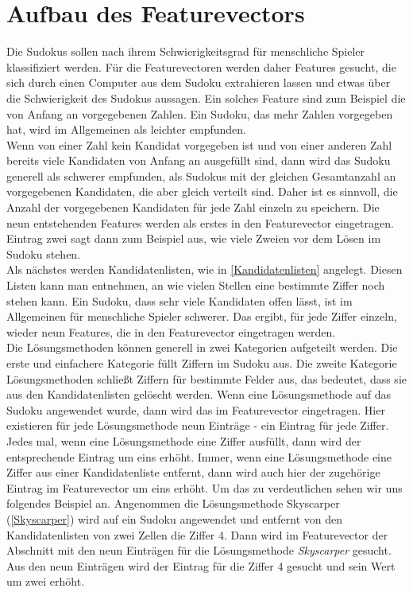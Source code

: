 \section{Aufbau des Featurevectors}
\label{Aufbau}
Die Sudokus sollen nach ihrem Schwierigkeitsgrad für menschliche Spieler klassifiziert werden. Für die Featurevectoren werden daher Features gesucht, die sich durch einen Computer aus dem Sudoku extrahieren lassen und etwas über die Schwierigkeit des Sudokus aussagen. Ein solches Feature sind zum Beispiel die von Anfang an vorgegebenen Zahlen. Ein Sudoku, das mehr Zahlen vorgegeben hat, wird im Allgemeinen als leichter empfunden.\\
Wenn von einer Zahl kein Kandidat vorgegeben ist und von einer anderen Zahl bereits viele Kandidaten von Anfang an ausgefüllt sind, dann wird das Sudoku generell als schwerer empfunden, als Sudokus mit der gleichen Gesamtanzahl an vorgegebenen Kandidaten, die aber gleich verteilt sind. Daher ist es sinnvoll, die Anzahl der vorgegebenen Kandidaten für jede Zahl einzeln zu speichern. Die neun entstehenden Features werden als erstes in den Featurevector eingetragen. Eintrag zwei sagt dann zum Beispiel aus, wie viele Zweien vor dem Lösen im Sudoku stehen.\\
Als nächstes werden Kandidatenlisten, wie in \ref{Kandidatenlisten} angelegt. Diesen Listen kann man entnehmen, an wie vielen Stellen eine bestimmte Ziffer noch stehen kann. Ein Sudoku, dass sehr viele Kandidaten offen lässt, ist im Allgemeinen für menschliche Spieler schwerer. Das ergibt, für jede Ziffer einzeln, wieder neun Features, die in den Featurevector eingetragen werden.\\
Die Lösungsmethoden können generell in zwei Kategorien aufgeteilt werden. Die erste und einfachere Kategorie füllt Ziffern im Sudoku aus. Die zweite Kategorie Lösungsmethoden schließt Ziffern für bestimmte Felder aus, das bedeutet, dass sie aus den Kandidatenlisten gelöscht werden. Wenn eine Lösungsmethode auf das Sudoku angewendet wurde, dann wird das im Featurevector eingetragen. Hier existieren für jede Lösungsmethode neun Einträge - ein Eintrag für jede Ziffer. Jedes mal, wenn eine Lösungsmethode eine Ziffer ausfüllt, dann wird der entsprechende Eintrag um eins erhöht. Immer, wenn eine Lösungsmethode eine Ziffer aus einer Kandidatenliste entfernt, dann wird auch hier der zugehörige Eintrag im Featurevector um eins erhöht. Um das zu verdeutlichen sehen wir uns folgendes Beispiel an. Angenommen die Lösungsmethode Skyscarper (\ref{Skyscarper}) wird auf ein Sudoku angewendet und entfernt von den Kandidatenlisten von zwei Zellen die Ziffer 4. Dann wird im Featurevector der Abschnitt mit den neun Einträgen für die Lösungsmethode \textit{Skyscarper} gesucht. Aus den neun Einträgen wird der Eintrag für die Ziffer 4 gesucht und sein Wert um zwei erhöht.\\
